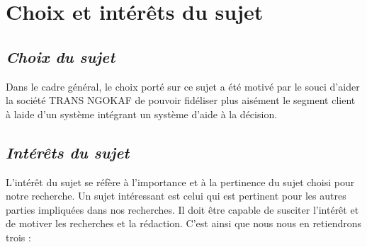     \section[Choix et interet du sujet]{Choix et intérêts du sujet}
        \subsection[Choix du sujet]{\textit{Choix du sujet}}
        Dans le cadre général, le choix porté sur ce sujet a été motivé par le souci d’aider
        la société TRANS NGOKAF de pouvoir fidéliser plus aisément le segment client à laide d’un
        système intégrant un système d’aide à la décision.
        \subsection[Interet du sujet]{\textit{Intérêts du sujet}}
        L’intérêt du sujet se réfère à l’importance et à la pertinence du sujet choisi pour notre recherche.
        Un sujet intéressant est celui qui est pertinent pour les autres parties impliquées dans nos recherches.
        Il doit être capable de susciter l’intérêt et de motiver les recherches et la rédaction. C’est ainsi
        que nous nous en retiendrons trois :
         \newline 
